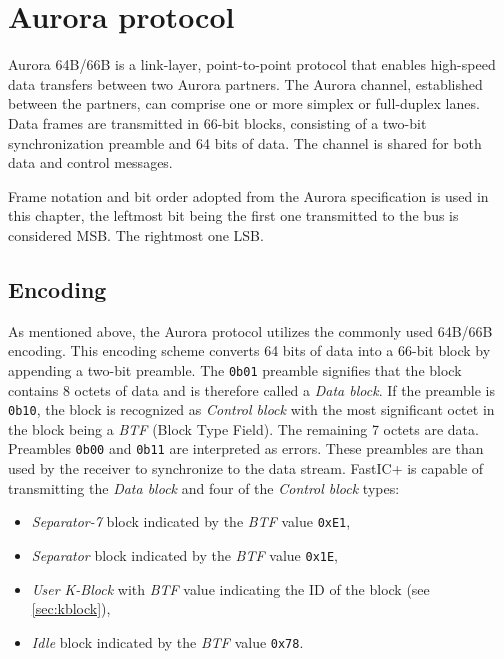 
\chapter{Aurora protocol}
Aurora 64B/66B is a link-layer, point-to-point protocol that enables high-speed data transfers between two Aurora partners. The Aurora channel, established between the partners, can comprise one or more simplex or full-duplex lanes. Data frames are transmitted in 66-bit blocks, consisting of a two-bit synchronization preamble and 64 bits of data. The channel is shared for both data and control messages. 

Frame notation and bit order adopted from the Aurora specification \cite{auroraSpec} is used in this chapter, the leftmost bit being the first one transmitted to the bus is considered MSB. The rightmost one LSB.
%
\section{Encoding}
As mentioned above, the Aurora protocol utilizes the commonly used 64B/66B encoding. This encoding scheme converts 64 bits of data into a 66-bit block by appending a two-bit preamble. The \verb|0b01| preamble signifies that the block contains 8 octets of data and is therefore called a \emph{Data block}. If the preamble is \verb|0b10|, the block is recognized as \emph{Control block} with the most significant octet in the block being a \emph{BTF} (Block Type Field). The remaining 7 octets are data. Preambles \verb|0b00| and \verb|0b11| are interpreted as errors. These preambles are than used by the receiver to synchronize to the data stream.
\newline\newline
FastIC+ is capable of transmitting the \emph{Data block} and four of the \emph{Control block} types:
\begin{itemize}
    \item \emph{Separator-7} block indicated by the \emph{BTF} value \verb|0xE1|,
    \item \emph{Separator} block indicated by the \emph{BTF} value \verb|0x1E|,
    \item \emph{User K-Block} with \emph{BTF} value indicating the ID of the block (see \ref{sec:kblock}),
    \item \emph{Idle} block indicated by the \emph{BTF} value \verb|0x78|.
\end{itemize}


